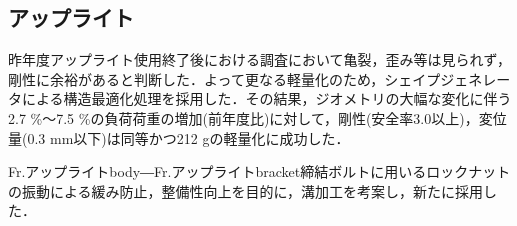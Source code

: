 \subsection{アップライト}
昨年度アップライト使用終了後における調査において亀裂，歪み等は見られず，剛性に余裕があると判断した．よって更なる軽量化のため，シェイプジェネレータによる構造最適化処理を採用した．その結果，ジオメトリの大幅な変化に伴う2.7 \%～7.5 \%の負荷荷重の増加(前年度比)に対して，剛性(安全率3.0以上)，変位量(0.3 mm以下)は同等かつ212 gの軽量化に成功した．

Fr.アップライトbody―Fr.アップライトbracket締結ボルトに用いるロックナットの振動による緩み防止，整備性向上を目的に，溝加工を考案し，新たに採用した．%
